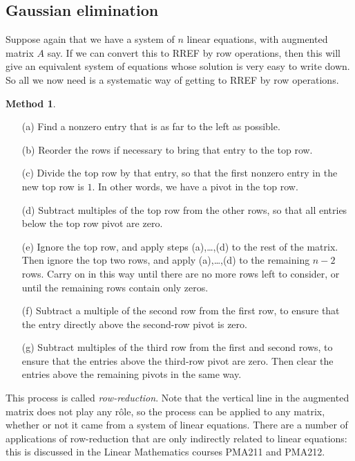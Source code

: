 \documentclass[a4paper]{book}
\newcommand{\PURPLE}[1]{{\color{purple}#1}}
\renewcommand{\:}{\colon}
\newcommand{\PMA}[1]{PMA#1}
\newcommand{\bilabel}[1]{\hypertarget{#1}{\label{#1}}}
\newcommand{\DEFN}[1]{\PURPLE{\emph{#1}}}
\theoremstyle{definition}
\newtheorem{method}[theorem]{Method}
\begin{document}
\subsection{Gaussian elimination}
\label{subsec-gauss}

Suppose again that we have a system of $n$ linear equations, with
augmented matrix $A$ say.  If we can convert this to RREF by row
operations, then this will give an equivalent system of equations
whose solution is very easy to write down.  So all we now need is a
systematic way of getting to RREF by row operations.  
\begin{method}\bilabel{alg-gauss}
 \begin{itemize}
  \item[(a)] Find a nonzero entry that is as far to the left as possible.
  \item[(b)] Reorder the rows if necessary to bring that entry to the
   top row.
  \item[(c)] Divide the top row by that entry, so that the first
   nonzero entry in the new top row is $1$.  In other words, we have a
   pivot in the top row.
  \item[(d)] Subtract multiples of the top row from the other rows, so
   that all entries below the top row pivot are zero.
  \item[(e)] Ignore the top row, and apply steps (a),\ldots,(d) to the rest
   of the matrix.  Then ignore the top two rows, and apply
   (a),\ldots,(d) to the remaining $n-2$ rows.  Carry on in this way
   until there are no more rows left to consider, or until the
   remaining rows contain only zeros.
  \item[(f)] Subtract a multiple of the second row from the first row,
   to ensure that the entry directly above the second-row pivot is
   zero.
  \item[(g)] Subtract multiples of the third row from the first and
   second rows, to ensure that the entries above the third-row pivot
   are zero.  Then clear the entries above the remaining pivots in the
   same way.
 \end{itemize}
\end{method}
This process is called \DEFN{row-reduction}.  Note that the vertical
line in the augmented matrix does not play any r\^ole, so the process
can be applied to any matrix, whether or not it came from a system of
linear equations.  There are a number of applications of row-reduction
that are only indirectly related to linear equations: this is
discussed in the Linear Mathematics courses \PMA{211} and \PMA{212}.
\end{document}
